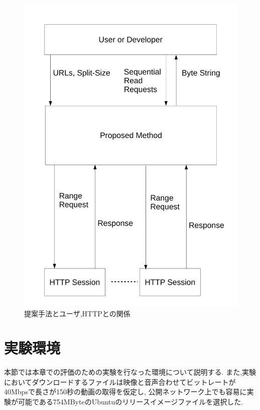 \documentclass[a4j,12pt]{gradthesis_utf8}
\begin{document}
\begin{figure}[h]
	\label{sphttp}
	\begin{center}
		\includegraphics[width=15cm]{figure/sphttp.pdf}
		\caption{提案手法とユーザ,HTTPとの関係}
	\end{center}
\end{figure}

\clearpage

\section{実験環境}
本節では本章での評価のための実験を行なった環境について説明する.
また,実験においてダウンロードするファイルは映像と音声合わせてビットレートが40Mbpsで長さが150秒の動画の取得を仮定し,
公開ネットワーク上でも容易に実験が可能である754MByteのUbuntuのリリースイメージファイルを選択した.
\end{document}
